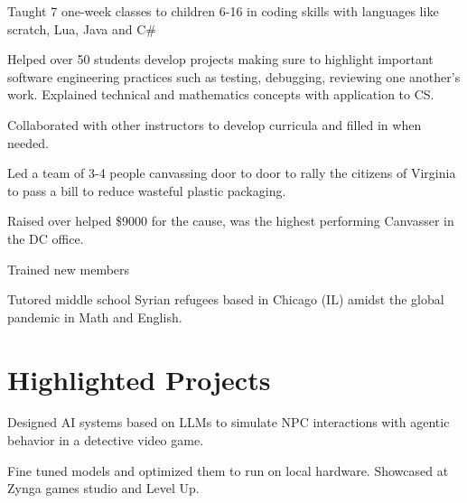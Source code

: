 \documentclass[letterpaper,10pt]{article}
\begin{document}
    
    \begin{resume_list}
        \item Taught 7 one-week classes to children 6-16 in coding skills with languages like scratch, Lua, Java and C\#
        \item Helped over 50 students develop projects making sure to highlight important software engineering practices
        such as testing, debugging, reviewing one another's work. Explained technical and mathematics concepts with application to CS. 
        \item Collaborated with other instructors to develop curricula and filled in when needed.
    \end{resume_list}

    
    \begin{resume_list}
        \item Led a team of 3-4 people canvassing door to door to rally the citizens of Virginia to pass a bill to reduce wasteful plastic packaging.
        \item Raised over helped \$9000 for the cause, was the highest performing Canvasser in the DC office.
        \item Trained new members
    \end{resume_list}
    \begin{resume_list}
        \item Tutored middle school Syrian refugees based in Chicago (IL) amidst the global pandemic in Math and English.
    \end{resume_list}
    



    \section{Highlighted Projects}

    \begin{resume_list}
        \item Designed AI systems based on LLMs to simulate NPC interactions with agentic behavior in a detective video game.
        \item Fine tuned models and optimized them to run on local hardware. Showcased at Zynga games studio and Level Up.
    \end{resume_list}
\end{document}
